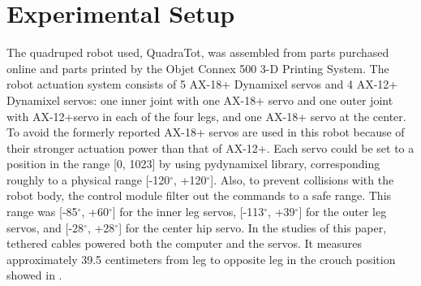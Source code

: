 \section{Experimental Setup}

The quadruped robot used, QuadraTot, was assembled from parts purchased online and
parts printed by the Objet Connex 500 3-D Printing System. The robot
actuation system consists of 5 AX-18+ Dynamixel servos and 4 AX-12+
Dynamixel servos: one inner joint with one AX-18+ servo and one outer
joint with AX-12+servo in each of the four legs, and one AX-18+ servo
at the center. To avoid the formerly reported  AX-18+ servos are used
in this robot because of their stronger actuation power than that of
AX-12+. Each servo could be set to a position in the range [0, 1023]
by using pydynamixel library, corresponding roughly to a physical range [-120$^\circ$,
  +120$^\circ$]. Also, to prevent collisions with the robot body, the control
module filter out the commands to a safe range. This range was [-85$^\circ$,
  +60$^\circ$] for the inner leg servos, [-113$^\circ$, +39$^\circ$] for the outer leg
servos, and [-28$^\circ$, +28$^\circ$] for the center hip servo. In the studies of
this paper, tethered cables powered both the computer and the
servos. It measures approximately 39.5 centimeters from leg to
opposite leg in the crouch position showed in . 

